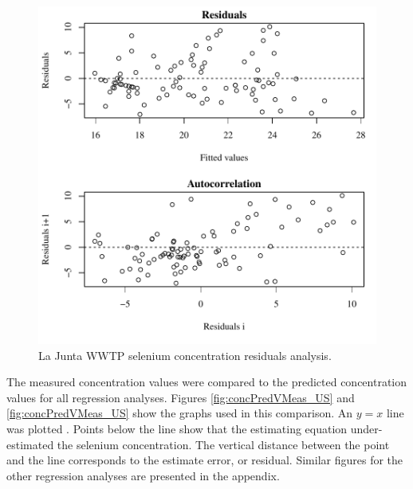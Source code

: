 \begin{linenumbers}
\begin{figure}[htbp]
	\centering
	\includegraphics[width=\tableCustomSize]{"Figures/Results_USR/Stochastic/Conc Model lm-fit WTP"}
	\caption[La Junta WWTP selenium concentration residuals analysis.]{La Junta WWTP selenium concentration residuals analysis.}
	\label{fig:concLajwwtpNLS}
\end{figure}

The measured concentration values were compared to the predicted concentration values for all regression analyses.  Figures \ref{fig:concPredVMeas_US} and \ref{fig:concPredVMeas_US} show the graphs used in this comparison.  An $y=x$ line was plotted .  Points below the line show that the estimating equation under-estimated the selenium concentration.  The vertical distance between the point and the line corresponds to the estimate error, or residual.  Similar figures for the other regression analyses are presented in the appendix.


\end{linenumbers}
